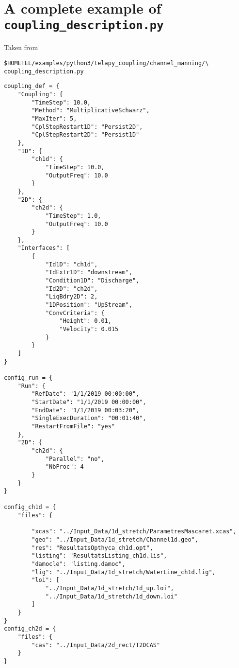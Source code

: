 \chapter{A complete example of
  \texttt{coupling\_description.py}}\label{app:coupling_description}

Taken from
\begin{verbatim}
$HOMETEL/examples/python3/telapy_coupling/channel_manning/\
coupling_description.py
\end{verbatim}

\begin{verbatim}
coupling_def = {
    "Coupling": {
        "TimeStep": 10.0,
        "Method": "MultiplicativeSchwarz",
        "MaxIter": 5,
        "CplStepRestart1D": "Persist2D",
        "CplStepRestart2D": "Persist1D"
    },
    "1D": {
        "ch1d": {
            "TimeStep": 10.0,
            "OutputFreq": 10.0
        }
    },
    "2D": {
        "ch2d": {
            "TimeStep": 1.0,
            "OutputFreq": 10.0
        }
    },
    "Interfaces": [
        {
            "Id1D": "ch1d",
            "IdExtr1D": "downstream",
            "Condition1D": "Discharge",
            "Id2D": "ch2d",
            "LiqBdry2D": 2,
            "1DPosition": "UpStream",
            "ConvCriteria": {
                "Height": 0.01,
                "Velocity": 0.015
            }
        }
    ]
}

config_run = {
    "Run": {
        "RefDate": "1/1/2019 00:00:00",
        "StartDate": "1/1/2019 00:00:00",
        "EndDate": "1/1/2019 00:03:20",
        "SingleExecDuration": "00:01:40",
        "RestartFromFile": "yes"
    },
    "2D": {
        "ch2d": {
            "Parallel": "no",
            "NbProc": 4
        }
    }
}

config_ch1d = {
    "files": {

        "xcas": "../Input_Data/1d_stretch/ParametresMascaret.xcas",
        "geo": "../Input_Data/1d_stretch/Channel1d.geo",
        "res": "ResultatsOpthyca_ch1d.opt",
        "listing": "ResultatsListing_ch1d.lis",
        "damocle": "listing.damoc",
        "lig": "../Input_Data/1d_stretch/WaterLine_ch1d.lig",
        "loi": [
            "../Input_Data/1d_stretch/1d_up.loi",
            "../Input_Data/1d_stretch/1d_down.loi"
        ]
    }
}
config_ch2d = {
    "files": {
        "cas": "../Input_Data/2d_rect/T2DCAS"
    }
}
\end{verbatim}

